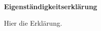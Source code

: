 \thispagestyle{empty}

\noindent
\begin{LARGE}
    \begin{center}
        \textbf{Eigenständigkeitserklärung} \\
    \end{center}
\end{LARGE}
    
\bigbreak
\bigbreak

\noindent
Hier die Erklärung.